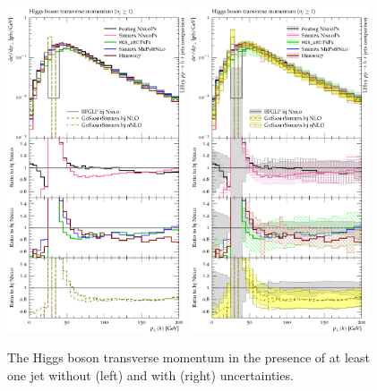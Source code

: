 \begin{figure}[t!]
  \centering
  \includegraphics[width=0.47\textwidth]{figures/hjetscomp_u_H_j_pT_incl.pdf}
  \hfill
  \includegraphics[width=0.47\textwidth]{figures/hjetscomp_H_j_pT_incl.pdf}
  \caption{
    The Higgs boson transverse momentum in the presence of at least
    one jet without (left) and with (right) uncertainties.
    \label{fig:higgscomp:results:1obs:hpt}
  }
\end{figure}

